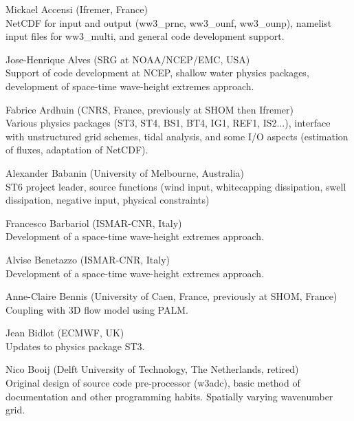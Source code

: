 \begin{list}{\ldots}{ }

\item [Mickael Accensi] (Ifremer, France) \\
  NetCDF for input and output (ww3\_prnc, ww3\_ounf, ww3\_ounp), namelist input files for ww3\_multi, and general code development support.

\item [Jose-Henrique Alves] (SRG at NOAA/NCEP/EMC, USA) \\
  Support of code development at NCEP, shallow water physics packages, development of space-time wave-height extremes approach.

\item [Fabrice Ardhuin] (CNRS, France, previously at SHOM then Ifremer) \\
  Various physics packages (ST3, ST4, BS1, BT4, IG1, REF1, IS2...), interface with unstructured grid schemes, tidal analysis, and some I/O aspects (estimation of fluxes, adaptation of NetCDF). 

\item [Alexander Babanin] (University of Melbourne, Australia)\\
  ST6 project leader, source functions (wind input, whitecapping dissipation, swell dissipation, negative input, physical constraints)

\item [Francesco Barbariol] (ISMAR-CNR, Italy) \\
  Development of a space-time wave-height extremes approach.

\item [Alvise Benetazzo] (ISMAR-CNR, Italy) \\
  Development of a space-time wave-height extremes approach.

\item [Anne-Claire Bennis] (University of Caen, France, previously at SHOM, France) \\
  Coupling with 3D flow model using PALM.

\item [Jean Bidlot] (ECMWF, UK) \\
  Updates to physics package ST3.

\item [Nico Booij] (Delft University of Technology, The Netherlands, retired) \\
  Original design of source code pre-processor ({\code w3adc}), basic method
  of documentation and other programming habits. Spatially varying wavenumber
  grid.


\end{list}
